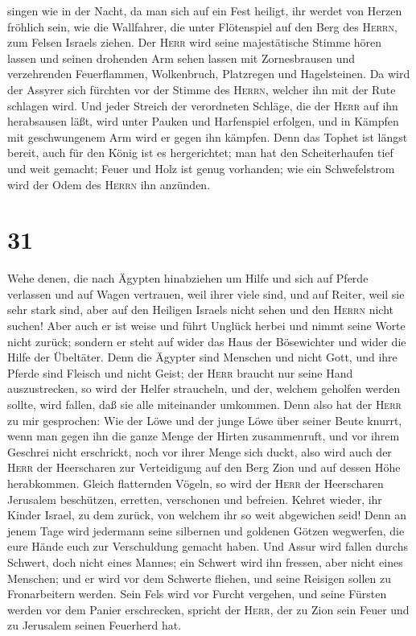 singen wie in der Nacht, da man sich auf ein Fest heiligt, ihr werdet
von Herzen fröhlich sein, wie die Wallfahrer, die unter Flötenspiel auf
den Berg des \textsc{Herrn}, zum Felsen Israels ziehen. 
Der \textsc{Herr} wird seine majestätische Stimme hören lassen und
seinen drohenden Arm sehen lassen mit Zornesbrausen und verzehrenden
Feuerflammen, Wolkenbruch, Platzregen und Hagelsteinen. 
Da wird der Assyrer sich fürchten vor der Stimme des \textsc{Herrn},
welcher ihn mit der Rute schlagen wird.  Und jeder
Streich der verordneten Schläge, die der \textsc{Herr} auf ihn
herabsausen läßt, wird unter Pauken und Harfenspiel erfolgen, und in
Kämpfen mit geschwungenem Arm wird er gegen ihn kämpfen. 
Denn das Tophet ist längst bereit, auch für den König ist es
hergerichtet; man hat den Scheiterhaufen tief und weit gemacht; Feuer
und Holz ist genug vorhanden; wie ein Schwefelstrom wird der Odem des
\textsc{Herrn} ihn anzünden.

\hypertarget{section-30}{%
\section{31}\label{section-30}}

 Wehe denen, die nach Ägypten hinabziehen um Hilfe und
sich auf Pferde verlassen und auf Wagen vertrauen, weil ihrer viele
sind, und auf Reiter, weil sie sehr stark sind, aber auf den Heiligen
Israels nicht sehen und den \textsc{Herrn} nicht suchen! 
Aber auch er ist weise und führt Unglück herbei und nimmt seine Worte
nicht zurück; sondern er steht auf wider das Haus der Bösewichter und
wider die Hilfe der Übeltäter.  Denn die Ägypter sind
Menschen und nicht Gott, und ihre Pferde sind Fleisch und nicht Geist;
der \textsc{Herr} braucht nur seine Hand auszustrecken, so wird der
Helfer straucheln, und der, welchem geholfen werden sollte, wird fallen,
daß sie alle miteinander umkommen.  Denn also hat der
\textsc{Herr} zu mir gesprochen: Wie der Löwe und der junge Löwe über
seiner Beute knurrt, wenn man gegen ihn die ganze Menge der Hirten
zusammenruft, und vor ihrem Geschrei nicht erschrickt, noch vor ihrer
Menge sich duckt, also wird auch der \textsc{Herr} der Heerscharen zur
Verteidigung auf den Berg Zion und auf dessen Höhe herabkommen.
 Gleich flatternden Vögeln, so wird der \textsc{Herr} der
Heerscharen Jerusalem beschützen, erretten, verschonen und befreien.
 Kehret wieder, ihr Kinder Israel, zu dem zurück, von
welchem ihr so weit abgewichen seid!  Denn an jenem Tage
wird jedermann seine silbernen und goldenen Götzen wegwerfen, die eure
Hände euch zur Verschuldung gemacht haben.  Und Assur wird
fallen durchs Schwert, doch nicht eines Mannes; ein Schwert wird ihn
fressen, aber nicht eines Menschen; und er wird vor dem Schwerte
fliehen, und seine Reisigen sollen zu Fronarbeitern werden.
 Sein Fels wird vor Furcht vergehen, und seine Fürsten
werden vor dem Panier erschrecken, spricht der \textsc{Herr}, der zu
Zion sein Feuer und zu Jerusalem seinen Feuerherd hat.

